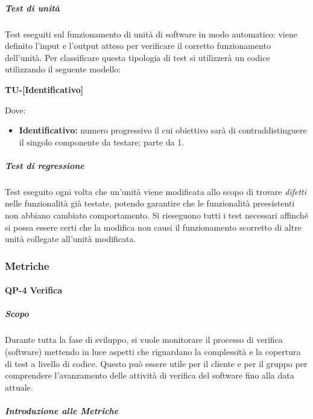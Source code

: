                     \subparagraph*{Test di unità}
                            Test eseguiti sul funzionamento di unità di software in modo automatico: viene definito l'input e l'output atteso per verificare il corretto funzionamento dell'unità.
                            Per classificare questa tipologia di test si utilizzerà un codice utilizzando il seguente modello:     

                            \begin{center}
                            	\textbf{TU-[Identificativo]}
                            \end{center}
                            Dove:
                            
							\begin{itemize}
                            	\item \textbf{Identificativo:} numero progressivo il cui obiettivo sarà di contraddistinguere il singolo componente da testare; parte da 1.
							\end{itemize}
						
                    \subparagraph*{Test di regressione}
        				Test eseguito ogni volta che un'unità viene modificata allo scopo di trovare \textit{difetti} nelle funzionalità già testate, potendo garantire che le funzionalità preesistenti non abbiano cambiato comportamento. Si rieseguono tutti i test necessari affinché si possa essere certi che la modifica non causi il funzionamento scorretto di altre unità collegate all'unità modificata.


                \subsubsection{Metriche}
                \paragraph{QP-4 Verifica}

                    \subparagraph{Scopo}

                        Durante tutta la fase di sviluppo, si vuole monitorare il processo di verifica (software) mettendo in luce aspetti che riguardano la complessità e la copertura di test a livello di codice. Questo può essere utile per il cliente e per il gruppo per comprendere l'avanzamento delle attività di verifica del software fino alla data attuale.

                    \subparagraph{Introduzione alle Metriche}

